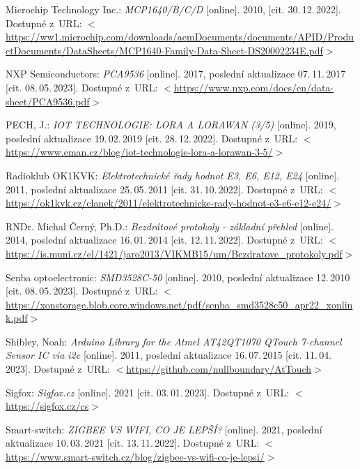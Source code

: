 \begin{thebibliography}{99}
    Microchip Technology Inc.:
    \emph{MCP1640/B/C/D}\/ [online].
    2010, [cit. 30.\,12.\,2022].
    Dostupné z~URL: 
    \(<\)\url{https://ww1.microchip.com/downloads/aemDocuments/documents/APID/ProductDocuments/DataSheets/MCP1640-Family-Data-Sheet-DS20002234E.pdf}\(>\)

    NXP Semiconductors:
    \emph{PCA9536}\/ [online].
    2017, poslední aktualizace 07.\,11.\,2017 [cit. 08.\,05.\,2023].
    Dostupné z~URL:
    \(<\)\url{https://www.nxp.com/docs/en/data-sheet/PCA9536.pdf}\(>\)

    PECH, J.:
    \emph{IOT TECHNOLOGIE: LORA A LORAWAN (3/5)}\/ [online].
    2019, poslední aktualizace 19.\,02.\,2019 [cit. 28.\,12.\,2022].
    Dostupné z~URL:
    \(<\)\url{https://www.eman.cz/blog/iot-technologie-lora-a-lorawan-3-5/}\(>\)

    Radioklub OK1KVK:
    \emph{Elektrotechnické řady hodnot E3, E6, E12, E24}\/ [online].
    2011, poslední aktualizace 25.\,05.\,2011 [cit. 31.\,10.\,2022].
    Dostupné z~URL: 
    \(<\)\url{https://ok1kvk.cz/clanek/2011/elektrotechnicke-rady-hodnot-e3-e6-e12-e24/}\(>\)

    RNDr. Michal Černý, Ph.D.:
    \emph{Bezdrátové protokoly - základní přehled}\/ [online].
    2014, poslední aktualizace 16.\,01.\,2014 [cit. 12.\,11.\,2022].
    Dostupné z~URL: 
    \(<\)\url{https://is.muni.cz/el/1421/jaro2013/VIKMB15/um/Bezdratove_protokoly.pdf}\(>\)

    Senba optoelectronic:
    \emph{SMD3528C-50}\/ [online].
    2010, poslední aktualizace 12.\,2010 [cit. 08.\,05.\,2023].
    Dostupné z~URL: 
    \(<\)\url{https://xonstorage.blob.core.windows.net/pdf/senba_smd3528c50_apr22_xonlink.pdf}\(>\)

    Shibley, Noah:
    \emph{Arduino Library for the Atmel AT42QT1070 QTouch 7-channel Sensor IC via i2c}\/ [online].
    2011, poslední aktualizace 16.\,07.\,2015 [cit. 11.\,04.\,2023].
    Dostupné z~URL: 
    \(<\)\url{https://github.com/nullboundary/AtTouch}\(>\)

    Sigfox:
    \emph{Sigfox.cz}\/ [online].
    2021 [cit. 03.\,01.\,2023].
    Dostupné z~URL: 
    \(<\)\url{https://sigfox.cz/cs}\(>\)

    Smart-switch:
    \emph{ZIGBEE VS WIFI, CO JE LEPŠÍ?}\/ [online].
    2021, poslední aktualizace 10.\,03.\,2021 [cit. 13.\,11.\,2022].
    Dostupné z~URL: 
    \(<\)\url{https://www.smart-switch.cz/blog/zigbee-vs-wifi-co-je-lepsi/}\(>\)


\end{thebibliography}

